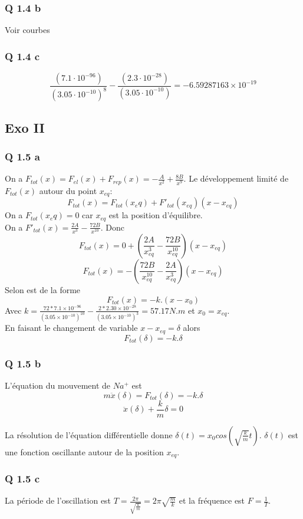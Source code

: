 \documentclass[]{book}
\theoremstyle{definition}
\begin{document}
\subsubsection*{Q 1.4 b}
Voir courbes


\subsubsection*{Q 1.4 c}
$$\frac{\left(7.1\cdot10^{-96}\right)}{\left(3.05\cdot10^{-10}\right)^{8}} - \frac{\left(2.3\cdot10^{-28}\right)}{\left(3.05\cdot10^{-10}\right)} = −6.59287163×10^{−19}$$


\subsection*{Exo II}

\subsubsection*{Q 1.5 a}
On a $F_{tot}(x) = F_{el}(x) + F_{rep}(x) = -\frac{A}{x^2} + \frac{8B}{x^9}$. Le d\'eveloppement limit\'e de $F_{tot}(x)$ autour du point $x_{eq}$:
$$F_{tot}(x) = F_{tot}(x_eq) + F'_{tot}(x_{eq})(x-x_{eq})$$
On a $F_{tot}(x_eq) = 0$ car $x_{eq}$ est la position d'\'equilibre.\\
On a $F'_{tot}(x) = \frac{2A}{x^3} - \frac{72B}{x^{10}}$. Donc
$$F_{tot}(x) = 0 + (\frac{2A}{x_{eq}^3} - \frac{72B}{x_{eq}^{10}})(x-x_{eq})$$
$$F_{tot}(x) = -(\frac{72B}{x_{eq}^{10}}-\frac{2A}{x_{eq}^3})(x-x_{eq})$$
Selon est de la forme
$$F_{tot}(x) = -k.(x-x_0)$$
Avec $k=\frac{72*7.1\times10^{-96}}{(3.05\times10^{-10})^{10}}-\frac{2*2.30\times10^{-28}}{(3.05\times10^{-10})^3} = 57.17 N.m$ et $x_0 = x_{eq}$.\\
En faisant le changement de variable $x-x_{eq} = \delta$ alors
$$F_{tot}(\delta) = -k.\delta$$

\subsubsection*{Q 1.5 b}
L'\'equation du mouvement de $Na^{+}$ est 
$$m\ddot{x}(\delta) = F_{tot}(\delta) = -k.\delta$$
$$\ddot{x}(\delta) + \frac{k}{m}\delta = 0$$

La r\'esolution de l'\'equation diff\'erentielle donne $\delta(t)=x_0cos(\sqrt{\frac{k}{m}}t)$. $\delta(t)$ est une fonction oscillante autour de la position $x_{eq}$.

\subsubsection*{Q 1.5 c}
La p\'eriode de l'oscillation est $T=\frac{2\pi}{\sqrt{\frac{k}{m}}} = 2\pi\sqrt{\frac{m}{k}}$ et la fr\'equence est $F=\frac{1}{T}$.\\
\end{document}

